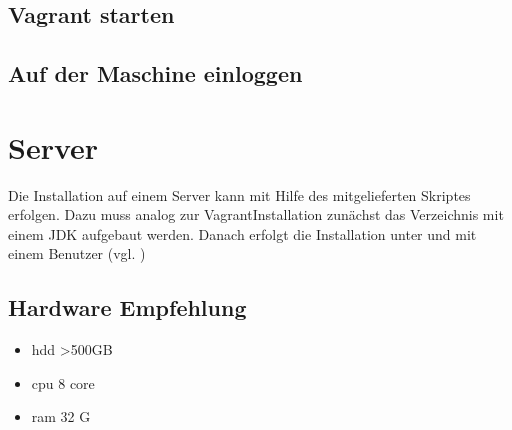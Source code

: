 \documentclass[letterpaper,10pt,english]{sphinxmanual}
\begin{document}
\begin{sphinxVerbatim}[commandchars=\\\{\}]
    
\end{sphinxVerbatim}


\subsection{Vagrant starten}
\label{\detokenize{toscience:vagrant-starten}}\label{\detokenize{toscience:id55}}
\begin{sphinxVerbatim}[commandchars=\\\{\}]
 
\end{sphinxVerbatim}


\subsection{Auf der Maschine einloggen}
\label{\detokenize{toscience:auf-der-maschine-einloggen}}\label{\detokenize{toscience:id56}}
\begin{sphinxVerbatim}[commandchars=\\\{\}]
 
\end{sphinxVerbatim}


\section{Server}
\label{\detokenize{toscience:server}}\label{\detokenize{toscience:id57}}
\sphinxAtStartPar
Die Installation auf einem Server kann mit Hilfe des mitgelieferten
Skriptes
erfolgen. Dazu muss analog zur Vagrant\sphinxhyphen{}Installation zunächst das 
Verzeichnis mit einem JDK aufgebaut werden. Danach erfolgt die
Installation unter  und mit einem Benutzer  (vgl.
)


\subsection{Hardware Empfehlung}
\label{\detokenize{toscience:hardware-empfehlung}}\label{\detokenize{toscience:id58}}\begin{itemize}
\item {} 
\sphinxAtStartPar
hdd \textgreater{}500GB

\item {} 
\sphinxAtStartPar
cpu 8 core

\item {} 
\sphinxAtStartPar
ram 32 G

\end{itemize}
\end{document}
